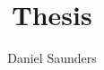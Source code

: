 \documentclass[11pt,twoside]{report}
\begin{document}
\title{Thesis}
\author{Daniel Saunders}

\maketitle
\tableofcontents


%

 
\end{document}
